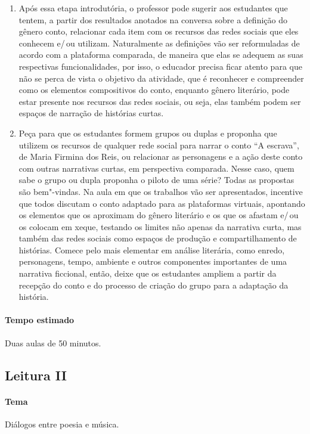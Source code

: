 \documentclass[12pt]{extarticle}
\begin{document}
\begin{enumerate}
\item
Após essa etapa introdutória, o professor pode sugerir aos estudantes
que tentem, a partir dos resultados anotados na conversa sobre a
definição do gênero conto, relacionar cada item com os recursos das
redes sociais que eles conhecem e/\,ou utilizam. Naturalmente as
definições vão ser reformuladas de acordo com a plataforma comparada, de
maneira que elas se adequem as suas respectivas funcionalidades, por
isso, o educador precisa ficar atento para que não se perca de vista o
objetivo da atividade, que é reconhecer e compreender como os elementos
compositivos do conto, enquanto gênero literário, pode estar presente
nos recursos das redes sociais, ou seja, elas também podem ser espaços
de narração de histórias curtas.

\item
Peça para que os estudantes formem grupos ou duplas e proponha que
utilizem os recursos de qualquer rede social para narrar o conto ``A
escrava'', de Maria Firmina dos Reis, ou relacionar as personagens e a
ação deste conto com outras narrativas curtas, em perspectiva comparada.
Nesse caso, quem sabe o grupo ou dupla proponha o piloto de uma série?
Todas as propostas são bem"-vindas. Na aula em que os trabalhos vão ser
apresentados, incentive que todos discutam o conto adaptado para as
plataformas virtuais, apontando os elementos que os aproximam do gênero
literário e os que os afastam e/\,ou os colocam em xeque, testando os
limites não apenas da narrativa curta, mas também das redes sociais como
espaços de produção e compartilhamento de histórias. Comece pelo mais
elementar em análise literária, como enredo, personagens, tempo,
ambiente e outros componentes importantes de uma narrativa ficcional,
então, deixe que os estudantes ampliem a partir da recepção do conto e
do processo de criação do grupo para a adaptação da história.
\end{enumerate}

\paragraph{Tempo estimado} Duas aulas de 50 minutos.

\subsection{Leitura II}

\paragraph{Tema} Diálogos entre poesia e música.
\end{document}
